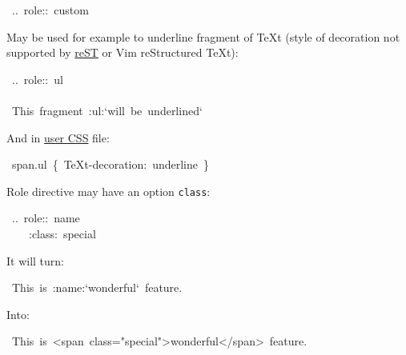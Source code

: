 \documentclass[12pt]{article}
\begin{document}
\begin{ttfamily}\begin{flushleft}
\mbox{~..~role::~custom}\\
\end{flushleft}\end{ttfamily}

May be used for example to underline fragment of \TeX{}t (style of decoration not
supported by \href{http://docutils.sf.net}{reST} or Vim reStructured \TeX{}t):

\begin{ttfamily}\begin{flushleft}
\mbox{~..~role::~ul}\\
\mbox{}\\
\mbox{~This~fragment~:ul:`will~be~underlined`}\\
\end{flushleft}\end{ttfamily}

And in \href{\#luser-css}{user CSS} file:

\begin{ttfamily}\begin{flushleft}
\mbox{~span.ul~\{~\TeX{}t-decoration:~underline~\}}\\
\end{flushleft}\end{ttfamily}

Role directive may have an option \texttt{class}:

\begin{ttfamily}\begin{flushleft}
\mbox{~..~role::~name}\\
\mbox{~~~~:class:~special}\\
\end{flushleft}\end{ttfamily}

It will turn:

\begin{ttfamily}\begin{flushleft}
\mbox{~This~is~:name:`wonderful`~feature.}\\
\end{flushleft}\end{ttfamily}

Into:

\begin{ttfamily}\begin{flushleft}
\mbox{~This~is~<span~class="special">wonderful</span>~feature.}\\
\end{flushleft}\end{ttfamily}
\end{document}
